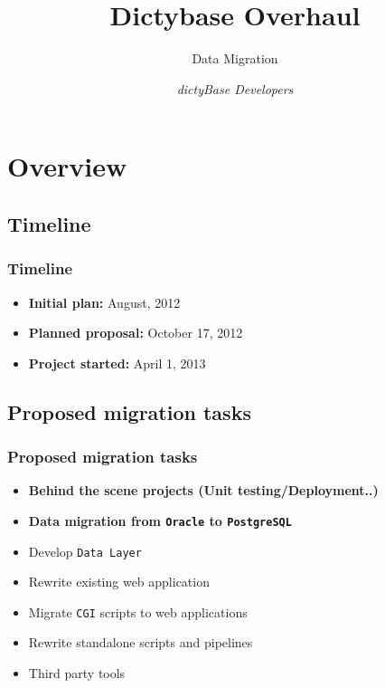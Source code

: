 \documentclass[hyperref={pdfpagelabels=false}, compress]{beamer}
\title{\textbf{Dictybase Overhaul}}
\subtitle{Data Migration}
\author{\textit{dictyBase Developers}}
\begin{document}
\frame{\titlepage}



\section{Overview}

\subsection{Timeline}
 \begin{frame}
 \frametitle{Timeline}
   \begin{itemize}
   
      \item  \textbf{Initial plan:} August, 2012
      \item \textbf{Planned proposal:} October 17, 2012
      \item \textbf{Project started:} April 1, 2013
      
   \end{itemize}
  \end{frame}

\subsection{Proposed migration tasks}
\begin{frame}
	\frametitle{Proposed migration tasks}
	
    	\begin{itemize}
    	\item \textbf{Behind the scene projects (Unit testing/Deployment..)}
		\item \textbf{Data migration from \texttt{Oracle} to \texttt{PostgreSQL}}
		\vspace{0.5cm}
    		\item Develop \texttt{Data Layer}
    		\item Rewrite existing web application
    		\item Migrate \texttt{CGI} scripts to web applications 
    		\item Rewrite standalone scripts and pipelines
    		\item Third party tools
	\end{itemize}
\end{frame}
\end{document}
